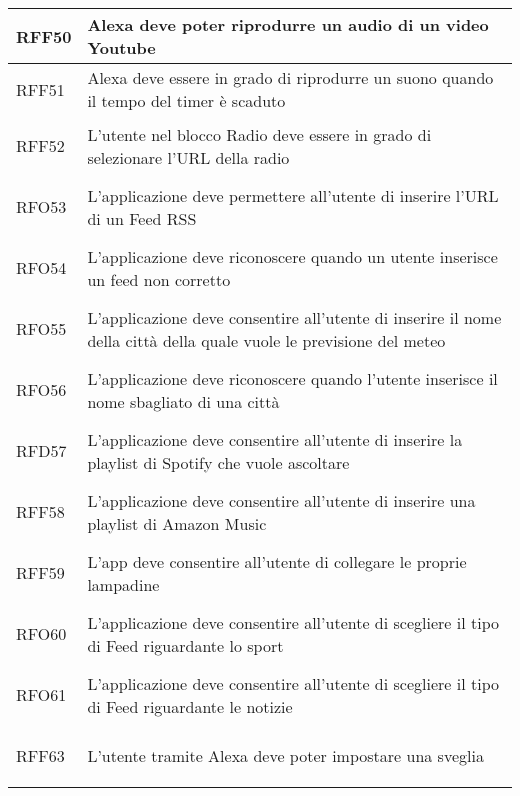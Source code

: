 \begin{longtable}{|>{\centering}m{5em}|m{25em}|}
	\hypertarget{RFF50}{RFF50} & Alexa deve poter riprodurre un audio di un video Youtube\\ \hline
	
	\hypertarget{RFF51}{RFF51} & Alexa deve essere in grado di riprodurre un suono quando il tempo del timer è scaduto\\ \hline
	
	\hypertarget{RFF52}{RFF52} & L'utente nel blocco Radio deve essere in grado di selezionare l'URL della radio\\ \hline
	
	\hypertarget{RFO53}{RFO53} & L'applicazione deve permettere all'utente di inserire l'URL di un Feed RSS\\ \hline
	
	\hypertarget{RFO54}{RFO54} & L'applicazione deve riconoscere quando un utente inserisce un feed non corretto\\ \hline
	
	\hypertarget{RFO55}{RFO55} & L'applicazione deve consentire all'utente di inserire il nome della città della quale vuole le previsione del meteo\\ \hline
	
	\hypertarget{RFO56}{RFO56} & L'applicazione deve riconoscere quando l'utente inserisce il nome sbagliato di una città\\ \hline
	
	\hypertarget{RFD57}{RFD57} & L'applicazione deve consentire all'utente di inserire la playlist di Spotify che vuole ascoltare\\ \hline
	
	\hypertarget{RFF58}{RFF58} & L'applicazione deve consentire all'utente di inserire una playlist di Amazon Music\\ \hline
	
	\hypertarget{RFF59}{RFF59} & L'app deve consentire all'utente di collegare le proprie lampadine\\ \hline
	
	\hypertarget{RFO60}{RFO60} & L'applicazione deve consentire all'utente di scegliere il tipo di Feed riguardante lo sport\\ \hline
	
	\hypertarget{RFO61}{RFO61} & L'applicazione deve consentire all'utente di scegliere il tipo di Feed riguardante le notizie\\ \hline
	
	\hypertarget{RFF63}{RFF63} & L'utente tramite Alexa deve poter impostare una sveglia\\ \hline
	

\end{longtable}

